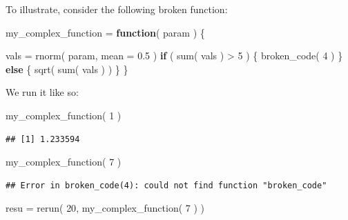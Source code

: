 \documentclass[
]{book}
\newenvironment{Shaded}{\begin{snugshade}}{\end{snugshade}}
\newcommand{\AttributeTok}[1]{\textcolor[rgb]{0.77,0.63,0.00}{#1}}
\newcommand{\ControlFlowTok}[1]{\textcolor[rgb]{0.13,0.29,0.53}{\textbf{#1}}}
\newcommand{\DecValTok}[1]{\textcolor[rgb]{0.00,0.00,0.81}{#1}}
\newcommand{\FloatTok}[1]{\textcolor[rgb]{0.00,0.00,0.81}{#1}}
\newcommand{\FunctionTok}[1]{\textcolor[rgb]{0.00,0.00,0.00}{#1}}
\newcommand{\NormalTok}[1]{#1}
\newcommand{\OtherTok}[1]{\textcolor[rgb]{0.56,0.35,0.01}{#1}}
\newcommand{\SpecialCharTok}[1]{\textcolor[rgb]{0.00,0.00,0.00}{#1}}
\begin{document}
To illustrate, consider the following broken function:

\begin{Shaded}
\begin{Highlighting}[]
\NormalTok{my\_complex\_function }\OtherTok{=} \ControlFlowTok{function}\NormalTok{( param ) \{}
    
\NormalTok{    vals }\OtherTok{=} \FunctionTok{rnorm}\NormalTok{( param, }\AttributeTok{mean =} \FloatTok{0.5}\NormalTok{ )}
    \ControlFlowTok{if}\NormalTok{ ( }\FunctionTok{sum}\NormalTok{( vals ) }\SpecialCharTok{\textgreater{}} \DecValTok{5}\NormalTok{ ) \{}
        \FunctionTok{broken\_code}\NormalTok{( }\DecValTok{4}\NormalTok{ )}
\NormalTok{    \} }\ControlFlowTok{else}\NormalTok{ \{}
        \FunctionTok{sqrt}\NormalTok{( }\FunctionTok{sum}\NormalTok{( vals ) )}
\NormalTok{    \}}
\NormalTok{\}}
\end{Highlighting}
\end{Shaded}

We run it like so:

\begin{Shaded}
\begin{Highlighting}[]
\FunctionTok{my\_complex\_function}\NormalTok{( }\DecValTok{1}\NormalTok{ )}
\end{Highlighting}
\end{Shaded}

\begin{verbatim}
## [1] 1.233594
\end{verbatim}

\begin{Shaded}
\begin{Highlighting}[]
\FunctionTok{my\_complex\_function}\NormalTok{( }\DecValTok{7}\NormalTok{ )}
\end{Highlighting}
\end{Shaded}

\begin{verbatim}
## Error in broken_code(4): could not find function "broken_code"
\end{verbatim}

\begin{Shaded}
\begin{Highlighting}[]
\NormalTok{resu }\OtherTok{=} \FunctionTok{rerun}\NormalTok{( }\DecValTok{20}\NormalTok{, }\FunctionTok{my\_complex\_function}\NormalTok{( }\DecValTok{7}\NormalTok{ ) )}
\end{Highlighting}
\end{Shaded}
\end{document}
